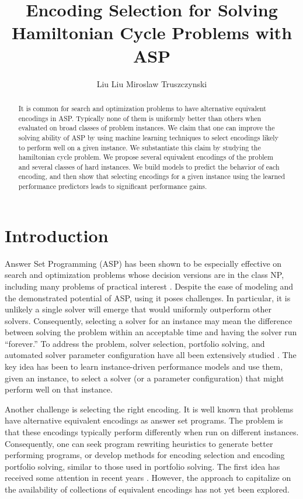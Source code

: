 \documentclass[submission,copyright,creativecommons]{eptcs}
\title{Encoding Selection for Solving Hamiltonian Cycle Problems with ASP}
\author{
Liu Liu \qquad\qquad Miroslaw Truszczynski
\institute{Department of Computer Science\\
University of Kentucky\\
Lexington, KY 40506, USA}
\email{\quad liu.liu@uky.edu \quad\qquad mirek@uky.edu}
}
\begin{document}
\maketitle

 \begin{abstract}
It is common for search and optimization problems to have alternative equivalent encodings in ASP. 
Typically none of them is uniformly better 
than others when evaluated on broad classes of problem instances.
We claim that one can improve the solving ability of ASP by using machine 
learning techniques to select encodings likely to perform well on 
a given instance. We substantiate this claim by studying the hamiltonian 
cycle problem. We propose several equivalent encodings of the problem and 
several classes of hard instances. We build models to predict the behavior 
of each encoding, and then show that selecting encodings for a given instance 
using the learned performance predictors leads to significant performance gains.
\end{abstract}

\section{Introduction}
Answer Set Programming (ASP) \cite{BrewkaET11} has been shown to be especially 
effective on 
search and optimization problems whose decision versions are in the class NP, 
including many problems of practical interest \cite{GebserMR17,ErdemGL16}. 
Despite the ease of modeling and the demonstrated potential of ASP, using it poses
challenges. In particular, it is unlikely a single solver will emerge that 
would uniformly outperform other solvers. Consequently, selecting a solver 
for an instance may mean the difference between solving the problem within 
an acceptable time and having the solver run ``forever.'' To address the 
problem, solver
selection, portfolio solving, and automated solver parameter configuration 
have all been extensively studied \cite{Rice76,GomesS01,KerschkeHNT19,MarateaPR14,HoosLS14}.
The key idea has been to learn
instance-driven performance models and use them, given an instance, to
select a solver (or a parameter configuration) that might perform well
on that instance. 

Another challenge is selecting the right encoding. It is well known that 
problems have alternative equivalent encodings as answer set programs. The 
problem is that these encodings typically perform differently when run on 
different instances. Consequently, one can seek program rewriting heuristics to generate better 
performing programs, or develop methods for encoding selection and encoding 
portfolio solving, similar to those used in portfolio solving. The first 
idea has received some attention in recent years 
\cite{BuddenhagenL15,BichlerMW16,HippenL19}. 
However, the approach to capitalize on the availability of collections of 
equivalent encodings has not yet been explored.
\end{document}
